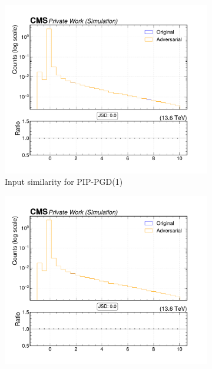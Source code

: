 \begin{figure}[htbp]
  \centering
  \begin{subfigure}[t]{0.32\textwidth}
    \includegraphics[width=\linewidth]{media/output/features/compare/combined_it_1/cmp_cpf_arr_Cpfcan_BtagPf_trackSip2dVal.pdf}
    \caption*{Input similarity for PIP-PGD(1)}
  \end{subfigure}\hfill
  \begin{subfigure}[t]{0.32\textwidth}
    \includegraphics[width=\linewidth]{media/output/features/compare/combined_it_2/cmp_cpf_arr_Cpfcan_BtagPf_trackSip2dVal.pdf}

\end{subfigure}
\end{figure}
